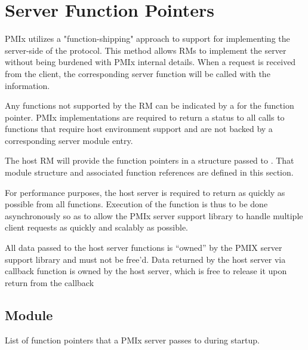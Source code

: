 \section{Server Function Pointers}

\ac{PMIx} utilizes a "function-shipping" approach to support for implementing the server-side of the protocol. This method allows \acp{RM} to implement the server without being burdened with \ac{PMIx} internal details. When a request is received from the client, the corresponding server function will be called with the information.

Any functions not supported by the \ac{RM} can be indicated by a  for the function pointer. \ac{PMIx} implementations are required to return a  status to all calls to functions that require host environment support and are not backed by a corresponding server module entry.

The host \ac{RM} will provide the function pointers in a  structure passed to .
That module structure and associated function references are defined in this section.

\advicermstart
For performance purposes, the host server is required to return as quickly as possible from all functions. Execution of
the function is thus to be done asynchronously so as to allow the \ac{PMIx} server support library to handle multiple client requests
as quickly and scalably as possible.

All data passed to the host server functions is ``owned'' by the
PMIX server support library and must not be free'd. Data returned
by the host server via callback function is owned by the host
server, which is free to release it upon return from the callback
\advicermend

\subsection{ Module}
\label{server:module_fns}
\summary

List of function pointers that a PMIx server passes to  during startup.

\format


